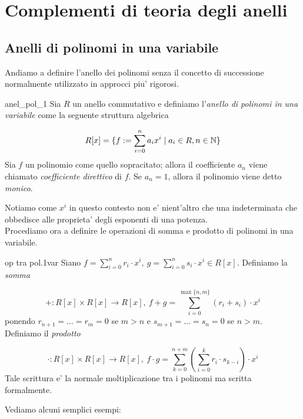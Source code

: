 \section{Complementi di teoria degli anelli}

\subsection{Anelli di polinomi in una variabile}

Andiamo a definire l'anello dei polinomi senza il concetto di successione normalmente 
utilizzato in approcci piu' rigorosi.


\begin{defn}{anel_pol_1}
Sia $R$ un anello commutativo e definiamo l'\emph{anello di polinomi in una variabile}
come la seguente struttura algebrica

\begin{equation}
R[x] = \{ f:= \sum\limits_{i=0}^{n}a_i x^i \mid a_i \in R, n\in \mathbb{N}\} 
\end{equation}
Sia $f$ un polinomio come quello sopracitato; allora il coefficiente $a_n$ viene chiamato 
\emph{coefficiente direttivo} di $f$. Se $a_n=1$, allora il polinomio viene detto \emph{monico}.
\end{defn}

Notiamo come $x^i$ in questo contesto non e' nient'altro che una indeterminata che
obbedisce alle proprieta' degli esponenti di una potenza. \\
Procediamo ora a definire le operazioni di somma e prodotto di polinomi in una variabile.

\begin{defn}{op tra pol.1var}
Siano $f = \sum_{i=0}^{n}r_i \cdot x^i,\ g = \sum_{i=0}^{n}s_i \cdot x^i \in R[x]$. 
Definiamo la \emph{somma}

\begin{equation}
+ : R[x] \times R[x] \to R[x],\ f + g = \sum\limits_{i=0}^{\max\{n,m\}} (r_i + s_i) \cdot x^i
\end{equation}
ponendo $r_{n+1} = \dots = r_m = 0$ se $m > n$ e $s_{m+1} = \dots = s_n = 0$ se $n > m$.\\
Definiamo il \emph{prodotto}

\begin{equation}
  \cdot : R[x] \times R[x] \to R[x],\ f\cdot g = \sum\limits_{k=0}^{n+m} (\sum\limits_{i=0}^{k} r_i \cdot s_{k-i}) \cdot x^i
\end{equation}
Tale scrittura e' la normale moltiplicazione tra i polinomi ma scritta formalmente.
\end{defn}
Vediamo alcuni semplici esempi: 

